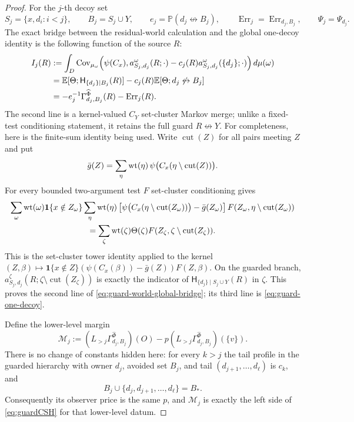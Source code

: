 \documentclass[11pt]{article}
\theoremstyle{definition}
\theoremstyle{remark}
\newcommand{\PP}{\mathbb P}
\newcommand{\EE}{\mathbb E}
\newcommand{\one}{\mathbf 1}
\newcommand{\ncon}{\not\leftrightarrow}
\begin{document}
\begin{proof}
For the $j$-th decoy set
\[
 S_j=\{x,d_i:i<j\},\qquad B_j=S_j\cup Y,\qquad
 e_j=\PP(d_j\ncon B_j),\qquad
 \operatorname{Err}_j=\operatorname{Err}_{d_j,B_j},
 \qquad \Psi_j=\Psi_{d_j}.
\]
The exact bridge between the residual-world calculation and the global
one-decoy identity is the following function of the source $R$:
\begin{align}
 I_j(R)
 &:={\int_D}\operatorname{Cov}_{\mu_\omega}\!\left(
       \psi(C_x),
       a^\omega_{S_j,d_j}(R;\mathord\cdot)
       -c_j(R)a^\omega_{S_j,d_j}(\{d_j\};\mathord\cdot)
       \right)d\mu(\omega)                                      \notag\\
 &=\EE[\Theta;\mathsf H_{\{d_j\}\mid B_j}(R)]
   -c_j(R)\EE[\Theta;d_j\ncon B_j]                              \notag\\
 &=-e_j^{-1}\Gamma_{d_j,B_j}^{\widehat\Phi}(R)
   -\operatorname{Err}_j(R).
 \label{eq:guard-world-global-bridge}
\end{align}
The second line is a kernel-valued $C_Y$ set-cluster Markov merge; unlike
a fixed-test conditioning statement, it retains the full guard
$R\ncon Y$.  For completeness, here is the finite-sum identity being
used.  Write $\operatorname{cut}(Z)$ for all pairs meeting $Z$ and put
\[
 \bar g(Z)=\sum_\eta {\rm wt}(\eta)\,
   \psi\bigl(C_x(\eta\setminus\operatorname{cut}(Z))\bigr).
\]
For every bounded two-argument test $F$ set-cluster conditioning gives
\begin{multline}\label{eq:guard-kernel-merge}
 \sum_\omega {\rm wt}(\omega)\one\{x\notin Z_\omega\}
 \sum_\eta {\rm wt}(\eta)
 \left[\psi\bigl(C_x(\eta\setminus\operatorname{cut}(Z_\omega))\bigr)
       -\bar g(Z_\omega)\right]
 F(Z_\omega,\eta\setminus\operatorname{cut}(Z_\omega))\\
 =\sum_\zeta {\rm wt}(\zeta)\Theta(\zeta)
 F(Z_\zeta,\zeta\setminus\operatorname{cut}(Z_\zeta)).
\end{multline}
This is the set-cluster tower identity applied to the kernel
$(Z,\beta)\mapsto\one\{x\notin Z\}
(\psi(C_x(\beta))-\bar g(Z))F(Z,\beta)$.  On the guarded branch,
$a^{\zeta}_{S_j,d_j}(R;\zeta\setminus\operatorname{cut}(Z_\zeta))$
is exactly the indicator of
$\mathsf H_{\{d_j\}\mid S_j\cup Y}(R)$ in $\zeta$.  This proves the
second line of \eqref{eq:guard-world-global-bridge}; its third line is
\eqref{eq:guard-one-decoy}.

Define the lower-level margin
\begin{equation}
 \mathcal M_j
 :=(L_{>j}\Gamma_{d_j,B_j}^{\widehat\Phi})(O)
   -p(L_{>j}\Gamma_{d_j,B_j}^{\widehat\Phi})(\{v\}).
 \label{eq:guard-M-def}
\end{equation}
There is no change of constants hidden here: for every $k>j$ the tail
profile in the guarded hierarchy with owner $d_j$, avoided set $B_j$,
and tail $(d_{j+1},\ldots,d_\ell)$ is $c_k$, and
\[
 B_j\cup\{d_j,d_{j+1},\ldots,d_\ell\}=B_*.
\]
Consequently its observer price is the same $p$, and $\mathcal M_j$ is
exactly the left side of \eqref{eq:guardCSH} for that lower-level datum.


\end{proof}
\end{document}
